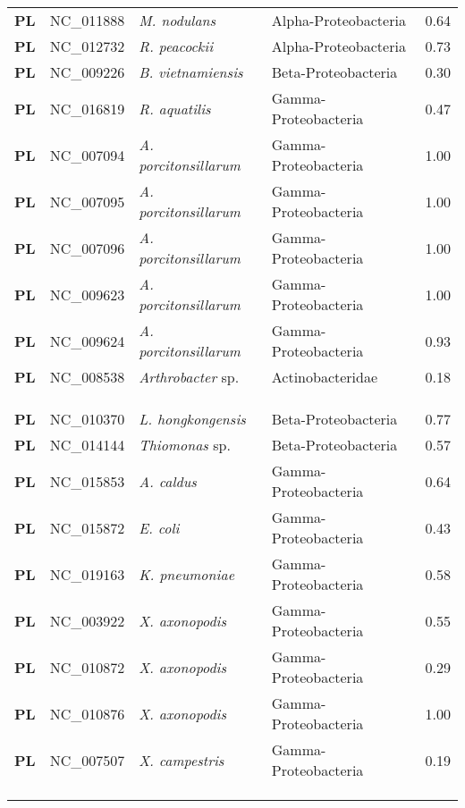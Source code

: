 \begin{adjustwidth}{-3cm}{2cm}
{\begin{supertabular}{>{\bfseries}l|p{0.1\textwidth}p{0.14\textwidth}l|l}
PL & NC\_011888 & \textit{M. nodulans} & Alpha-Proteobacteria & 0.64\\
PL & NC\_012732 & \textit{R. peacockii} & Alpha-Proteobacteria & 0.73\\
PL & NC\_009226 & \textit{B. vietnamiensis} & Beta-Proteobacteria & 0.30\\
PL & NC\_016819 & \textit{R. aquatilis} & Gamma-Proteobacteria & 0.47\\
PL & NC\_007094 & \textit{A. porcitonsillarum} & Gamma-Proteobacteria & 1.00\\
PL & NC\_007095 & \textit{A. porcitonsillarum} & Gamma-Proteobacteria & 1.00\\
PL & NC\_007096 & \textit{A. porcitonsillarum} & Gamma-Proteobacteria & 1.00\\
PL & NC\_009623 & \textit{A. porcitonsillarum} & Gamma-Proteobacteria & 1.00\\
PL & NC\_009624 & \textit{A. porcitonsillarum} & Gamma-Proteobacteria & 0.93\\
PL & NC\_008538 & \textit{Arthrobacter} sp. & Actinobacteridae & 0.18\\
\\
\\
\hline\\
PL & NC\_010370 & \textit{L. hongkongensis} & Beta-Proteobacteria & 0.77\\
PL & NC\_014144 & \textit{Thiomonas} sp. & Beta-Proteobacteria & 0.57\\
PL & NC\_015853 & \textit{A. caldus} & Gamma-Proteobacteria & 0.64\\
PL & NC\_015872 & \textit{E. coli} & Gamma-Proteobacteria & 0.43\\
PL & NC\_019163 & \textit{K. pneumoniae} & Gamma-Proteobacteria & 0.58\\
PL & NC\_003922 & \textit{X. axonopodis} & Gamma-Proteobacteria & 0.55\\
PL & NC\_010872 & \textit{X. axonopodis} & Gamma-Proteobacteria & 0.29\\
PL & NC\_010876 & \textit{X. axonopodis} & Gamma-Proteobacteria & 1.00\\
PL & NC\_007507 & \textit{X. campestris} & Gamma-Proteobacteria & 0.19\\
\\
\\
\hline\\

\end{supertabular}}
\end{adjustwidth}
